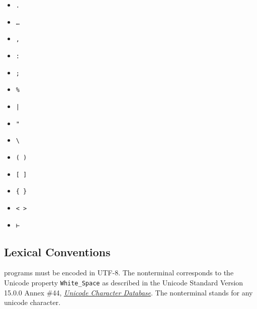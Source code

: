 {\setlength{\columnseprule}{0.4pt}
\begin{multicols}{3}
\begin{itemize}[label={}, nolistsep]
\item \texttt{.}
\item \texttt{…}
\item \texttt{,}
\item \texttt{:}
\item \texttt{;}
\item \texttt{\%}
\item \texttt{|}
\item \texttt{"}
\item \texttt{\textbackslash}
\item \texttt{( )}
\item \texttt{[ ]}
\item \texttt{\{ \}}
\item \texttt{< >}
\item \texttt{⊢}
\end{itemize}
\end{multicols}
}

\subsection{Lexical Conventions}\label{section:lexical-convention}

\Beluga programs must be encoded in \textsc{UTF-8}.
The nonterminal  corresponds to the Unicode property \texttt{White\_Space} as described in the Unicode Standard Version 15.0.0 Annex \#44, \href{https://www.unicode.org/reports/tr44/tr44-30.html#White_Space}{\textit{Unicode Character Database}}.
The nonterminal  stands for any unicode character.

